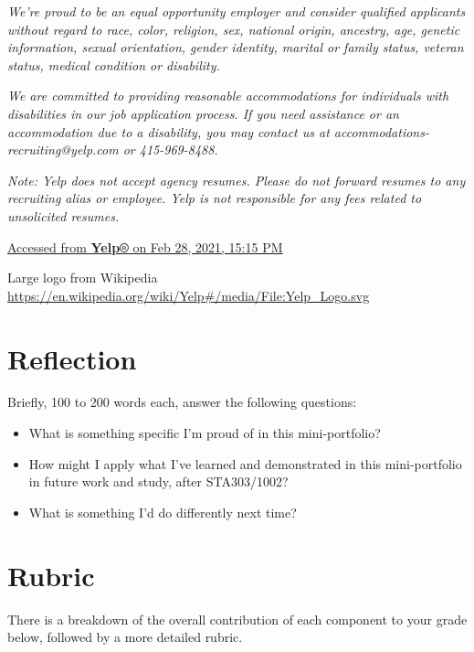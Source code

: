 \documentclass[
  openany]{book}
\begin{document}
\emph{We're proud to be an equal opportunity employer and consider qualified applicants without regard to race, color, religion, sex, national origin, ancestry, age, genetic information, sexual orientation, gender identity, marital or family status, veteran status, medical condition or disability.}

\emph{We are committed to providing reasonable accommodations for individuals with disabilities in our job application process. If you need assistance or an accommodation due to a disability, you may contact us at accommodations-recruiting@yelp.com or 415-969-8488.}

\emph{Note: Yelp does not accept agency resumes. Please do not forward resumes to any recruiting alias or employee. Yelp is not responsible for any fees related to unsolicited resumes.}

\href{https://www.yelp.careers/us/en/job/YELPUS97AE2C833B0240318A66253960395242EXTERNALENUS/Data-Scientist-Remote}{Accessed from \textbf{Yelp®} on Feb 28, 2021, 15:15 PM}

Large logo from Wikipedia \url{https://en.wikipedia.org/wiki/Yelp\#/media/File:Yelp_Logo.svg}

\newpage

\hypertarget{reflection}{%
\section{Reflection}\label{reflection}}

Briefly, 100 to 200 words each, answer the following questions:

\begin{itemize}
\item
  What is something specific I'm proud of in this mini-portfolio?
\item
  How might I apply what I've learned and demonstrated in this mini-portfolio in future work and study, after STA303/1002?
\item
  What is something I'd do differently next time?
\end{itemize}

\newpage

\hypertarget{rubric}{%
\section{Rubric}\label{rubric}}

There is a breakdown of the overall contribution of each component to your grade below, followed by a more detailed rubric.
\end{document}
